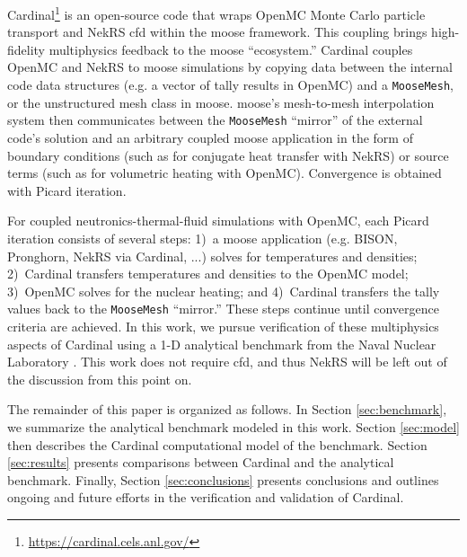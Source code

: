 \documentclass[letterpaper]{mc2023}
\begin{document}
Cardinal\footnote{\url{https://cardinal.cels.anl.gov/}} is an open-source code \cite{novak2022-cardinal}
that wraps OpenMC \cite{openmc} Monte Carlo particle transport and NekRS \cite{nekrs} \gls{cfd} within the \gls{moose}
\cite{lindsay2022moose} framework. This coupling brings high-fidelity multiphysics feedback to the \gls{moose} ``ecosystem.''
Cardinal couples OpenMC and NekRS to \gls{moose} simulations by copying data between the internal code data structures
(e.g. a vector of tally results in OpenMC) and a \texttt{MooseMesh}, or the unstructured mesh class in \gls{moose}. \gls{moose}'s
mesh-to-mesh interpolation system then communicates between the \texttt{MooseMesh} ``mirror'' of the external code's solution
and an arbitrary coupled \gls{moose} application in the form of boundary conditions (such as for conjugate heat transfer with
NekRS) or source terms (such as for volumetric heating with OpenMC). Convergence is obtained with Picard iteration.

For coupled neutronics-thermal-fluid simulations with OpenMC, each Picard iteration consists of several steps: 1)~a \gls{moose}
application (e.g. BISON, Pronghorn, NekRS via Cardinal, ...) solves for temperatures and densities; 2)~Cardinal transfers
temperatures and densities to the OpenMC model; 3)~OpenMC solves for the nuclear heating; and 4)~Cardinal transfers the tally
values back to the \texttt{MooseMesh} ``mirror.'' These steps continue until convergence criteria are achieved. In this work, we
pursue verification of these multiphysics aspects of Cardinal using a 1-D analytical benchmark from the Naval Nuclear
Laboratory \cite{analytical-benchmark}.  This work does not require \gls{cfd}, and thus NekRS will be left out of the
discussion from this point on.

The remainder of this paper is organized as follows. In Section \ref{sec:benchmark}, we summarize the analytical benchmark
modeled in this work. Section \ref{sec:model} then describes the Cardinal computational model of the benchmark. Section
\ref{sec:results} presents comparisons between Cardinal and the analytical benchmark. Finally, Section \ref{sec:conclusions}
presents conclusions and outlines ongoing and future efforts in the verification and validation of Cardinal.
\end{document}
